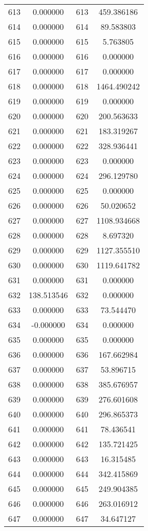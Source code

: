 \documentclass[12pt]{article}
\begin{document}
\begin{longtable}{@{}cccc@{}}
613 & 0.000000 & 613 & 459.386186 \\
614 & 0.000000 & 614 & 89.583803 \\
615 & 0.000000 & 615 & 5.763805 \\
616 & 0.000000 & 616 & 0.000000 \\
617 & 0.000000 & 617 & 0.000000 \\
618 & 0.000000 & 618 & 1464.490242 \\
619 & 0.000000 & 619 & 0.000000 \\
620 & 0.000000 & 620 & 200.563633 \\
621 & 0.000000 & 621 & 183.319267 \\
622 & 0.000000 & 622 & 328.936441 \\
623 & 0.000000 & 623 & 0.000000 \\
624 & 0.000000 & 624 & 296.129780 \\
625 & 0.000000 & 625 & 0.000000 \\
626 & 0.000000 & 626 & 50.020652 \\
627 & 0.000000 & 627 & 1108.934668 \\
628 & 0.000000 & 628 & 8.697320 \\
629 & 0.000000 & 629 & 1127.355510 \\
630 & 0.000000 & 630 & 1119.641782 \\
631 & 0.000000 & 631 & 0.000000 \\
632 & 138.513546 & 632 & 0.000000 \\
633 & 0.000000 & 633 & 73.544470 \\
634 & -0.000000 & 634 & 0.000000 \\
635 & 0.000000 & 635 & 0.000000 \\
636 & 0.000000 & 636 & 167.662984 \\
637 & 0.000000 & 637 & 53.896715 \\
638 & 0.000000 & 638 & 385.676957 \\
639 & 0.000000 & 639 & 276.601608 \\
640 & 0.000000 & 640 & 296.865373 \\
641 & 0.000000 & 641 & 78.436541 \\
642 & 0.000000 & 642 & 135.721425 \\
643 & 0.000000 & 643 & 16.315485 \\
644 & 0.000000 & 644 & 342.415869 \\
645 & 0.000000 & 645 & 249.904385 \\
646 & 0.000000 & 646 & 263.016912 \\
647 & 0.000000 & 647 & 34.647127 \\

\end{longtable}
\end{document}
